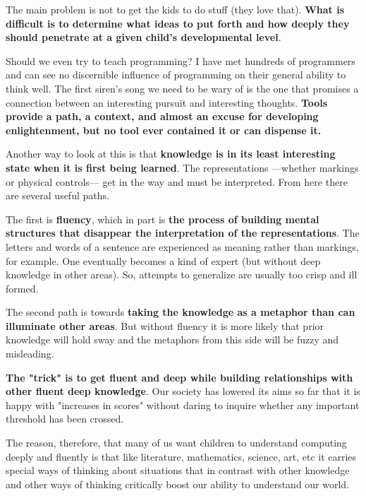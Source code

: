 \documentclass[letterpaper,12pt,parskip=full]{article}
\begin{document}
The main problem is not to get the kids to do stuff (they love that). \textbf{What is difficult is to determine what ideas to put forth and how deeply they should penetrate at a given child's developmental level}.

Should we even try to teach programming? I have met hundreds of programmers and can see no discernible influence of programming on their general ability to think well. The first siren's song we need to be wary of is the one that promises a connection between an interesting pursuit and interesting thoughts. \textbf{Tools provide a path, a context, and almost an excuse for developing enlightenment, but no tool ever contained it or can dispense it.}

Another way to look at this is that \textbf{knowledge is in its least interesting state when it is first being learned}. The representations —whether markings or physical controls— get in the way and must be interpreted. From here there are several useful paths.

The first is \textbf{fluency}, which in part is \textbf{the process of building mental structures that disappear the interpretation of the representations}. The letters and words of a sentence are experienced as meaning rather than markings, for example. One eventually becomes a kind of expert (but without deep knowledge in other areas). So, attempts to generalize are usually too crisp and ill formed.

The second path is towards \textbf{taking the knowledge as a metaphor than can illuminate other areas}. But without fluency it is more likely that prior knowledge will hold sway and the metaphors from this side will be fuzzy and misleading.

\textbf{The "trick" is to get fluent and deep while building relationships with other fluent deep knowledge}. Our society has lowered its aims so far that it is happy with "increases in scores" without daring to inquire whether any important threshold has been crossed. 

The reason, therefore, that many of us want children to understand computing deeply and fluently is that like literature, mathematics, science, art, etc it carries special ways of thinking about situations that in contrast with other knowledge and other ways of thinking critically boost our ability to understand our world. 
\end{document}
